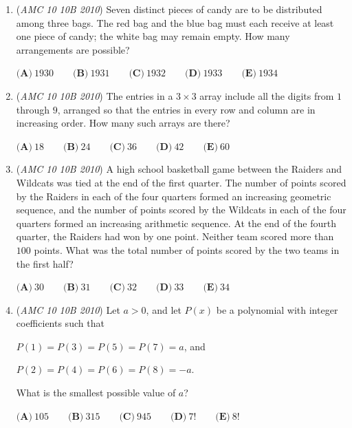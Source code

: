 \begin{enumerate}
 $\textbf{(A)}\ \dfrac{1}{10} \qquad \textbf{(B)}\ \dfrac{1}{9} \qquad \textbf{(C)}\ \dfrac{1}{7} \qquad \textbf{(D)}\ \dfrac{1}{6} \qquad \textbf{(E)}\ \dfrac{1}{5}$


	\item (\textit{AMC 10 10B 2010}) Seven distinct pieces of candy are to be distributed among three bags. The red bag and the blue bag must each receive at least one piece of candy; the white bag may remain empty. How many arrangements are possible?


 $\textbf{(A)}\ 1930 \qquad \textbf{(B)}\ 1931 \qquad \textbf{(C)}\ 1932 \qquad \textbf{(D)}\ 1933 \qquad \textbf{(E)}\ 1934$


	\item (\textit{AMC 10 10B 2010}) The entries in a $3 \times 3$ array include all the digits from $1$ through $9$, arranged so that the entries in every row and column are in increasing order. How many such arrays are there?


 $\textbf{(A)}\ 18 \qquad \textbf{(B)}\ 24 \qquad \textbf{(C)}\ 36 \qquad \textbf{(D)}\ 42 \qquad \textbf{(E)}\ 60$


	\item (\textit{AMC 10 10B 2010}) A high school basketball game between the Raiders and Wildcats was tied at the end of the first quarter. The number of points scored by the Raiders in each of the four quarters formed an increasing geometric sequence, and the number of points scored by the Wildcats in each of the four quarters formed an increasing arithmetic sequence. At the end of the fourth quarter, the Raiders had won by one point. Neither team scored more than $100$ points. What was the total number of points scored by the two teams in the first half?


 $\textbf{(A)}\ 30 \qquad \textbf{(B)}\ 31 \qquad \textbf{(C)}\ 32 \qquad \textbf{(D)}\ 33 \qquad \textbf{(E)}\ 34$


	\item (\textit{AMC 10 10B 2010}) Let $a > 0$, and let $P(x)$ be a polynomial with integer coefficients such that


 
$P(1) = P(3) = P(5) = P(7) = a$, and

$P(2) = P(4) = P(6) = P(8) = -a$.


 


 What is the smallest possible value of $a$?


 $\textbf{(A)}\ 105 \qquad \textbf{(B)}\ 315 \qquad \textbf{(C)}\ 945 \qquad \textbf{(D)}\ 7! \qquad \textbf{(E)}\ 8!$


\end{enumerate}